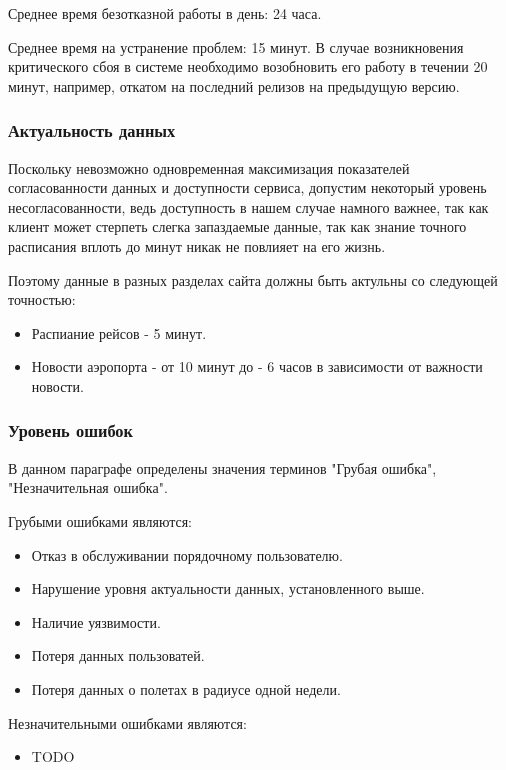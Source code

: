 Среднее время безотказной работы в день: 24 часа.

Среднее время на устранение проблем: 15 минут.
В случае возникновения критического сбоя в системе
необходимо возобновить его работу в течении 20 минут,
например, откатом на последний релизов на 
предыдущую версию.

\subsubsection{Актуальность данных}

Поскольку невозможно одновременная максимизация
показателей согласованности данных и доступности 
сервиса, допустим некоторый уровень несогласованности,
ведь доступность в нашем случае намного важнее,
так как клиент может стерпеть слегка запаздаемые
данные, так как знание точного расписания вплоть до
минут никак не повлияет на его жизнь.

Поэтому данные в разных разделах сайта должны 
быть актульны со следующей точностью:
\begin{itemize}
  \item Распиание рейсов - 5 минут.
  \item Новости аэропорта - от 10 минут
        до - 6 часов в зависимости от
        важности новости.
\end{itemize}

\subsubsection{Уровень ошибок}

В данном параграфе определены значения терминов
"Грубая ошибка", "Незначительная ошибка".

Грубыми ошибками являются:
\begin{itemize}
  \item Отказ в обслуживании 
        порядочному пользователю.
  \item Нарушение уровня актуальности данных, 
        установленного выше.
  \item Наличие уязвимости.
  \item Потеря данных пользоватей.
  \item Потеря данных о полетах 
        в радиусе одной недели.
\end{itemize}

Незначительными ошибками являются:
\begin{itemize}
  \item TODO
\end{itemize}


